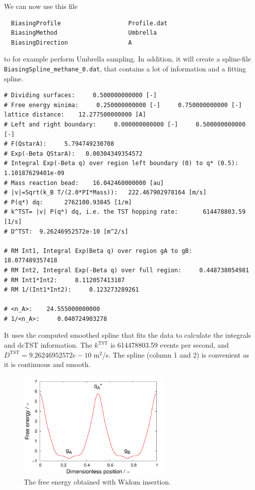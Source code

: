 We can now use this file
\begin{verbatim}
  BiasingProfile                   Profile.dat
  BiasingMethod                    Umbrella
  BiasingDirection                 A
\end{verbatim}
to for example perform Umbrella sampling. In addition, it will create a spline-file
\verb+BiasingSpline_methane_0.dat+, that contains a lot of information and a fitting spline.
\begin{small}
\begin{verbatim}
# Dividing surfaces:     0.500000000000 [-]
# Free energy minima:     0.250000000000 [-]     0.750000000000 [-]  lattice distance:    12.277500000000 [A]
# Left and right boundary:     0.000000000000 [-]     0.500000000000 [-]
# F(QstarA):     5.794749230708
# Exp(-Beta QStarA):   0.00304349354572
# Integral Exp(-Beta q) over region left boundary (0) to q* (0.5):  1.10187629401e-09
# Mass reaction bead:    16.042460000000 [au]
# |v|=Sqrt(k_B T/(2.0*PI*Mass)):   222.467902978164 [m/s]
# P(q*) dq:      2762100.93845 [1/m]
# k^TST= |v| P(q*) dq, i.e. the TST hopping rate:       614478803.59 [1/s]
# D^TST:  9.26246952572e-10 [m^2/s]

# RM Int1, Integral Exp(Beta q) over region gA to gB:    18.077489357418
# RM Int2, Integral Exp(-Beta q) over full region:     0.448738054981
# RM Int1*Int2:     8.112057413187
# RM 1/(Int1*Int2):     0.123273289261

# <n_A>:    24.555000000000
# 1/<n_A>:     0.040724903278
\end{verbatim}
\end{small}
It uses the computed smoothed spline that fits the data to calculate the integrals and dcTST information.
The $k^\text{TST}$ is 614478803.59 events per second, and $D^\text{TST}=9.26246952572e-10$ m$^2$/s.
The spline (column 1 and 2) is convenient as it is continuous and smooth.

\begin{figure}[t]
  \centering
  \includegraphics[width=7.5cm]{./Examples/Figures/Umbrella/BiasingProfile/BiasingSpline.pdf}
  \caption{The free energy obtained with Widom insertion.}
  \label{Fig: LTA Widom}
\end{figure}


